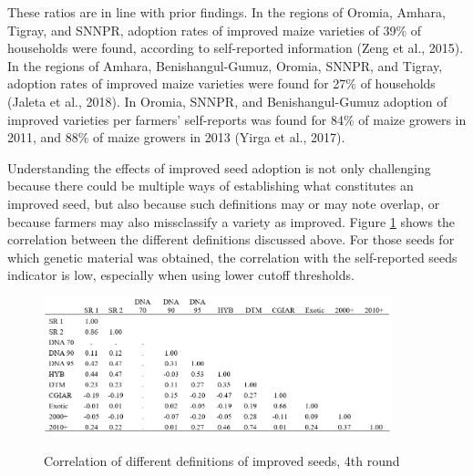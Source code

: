 \documentclass{article}
\begin{document}
These ratios are in line with prior findings. In the regions of Oromia, Amhara, Tigray, and SNNPR, adoption rates of improved maize varieties of 39\% of households were found, according to self-reported information (Zeng et al., 2015). In the regions of Amhara, Benishangul-Gumuz, Oromia, SNNPR, and Tigray, adoption rates of improved maize varieties were found for 27\% of households (Jaleta et al., 2018). In Oromia, SNNPR, and Benishangul-Gumuz adoption of improved varieties per farmers’ self-reports was found for 84\% of maize growers in 2011, and 88\% of maize growers in 2013 (Yirga et al., 2017).

Understanding the effects of improved seed adoption is not only challenging because there could be multiple ways of establishing what constitutes an improved seed, but also because such definitions may or may note overlap, or because farmers may also missclassify a variety as improved. Figure \ref{fig:missclassification} shows the correlation between the different definitions discussed above. For those seeds for which genetic material was obtained, the correlation with the self-reported seeds indicator is low, especially when using lower cutoff thresholds. 

\begin{figure}
    \centering
    \caption{Correlation of different definitions of improved seeds, 4th round}
    \includegraphics[width = 0.9\textwidth]{results/figures/missclassification.png}
    \label{fig:missclassification}
\end{figure}
\end{document}
